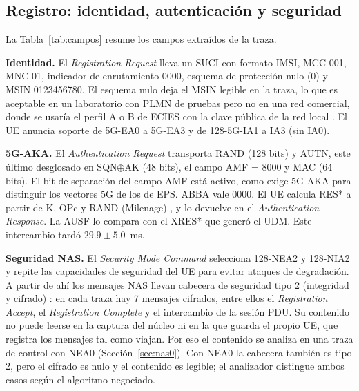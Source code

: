 \documentclass[conference]{IEEEtran}
\begin{document}
\subsection{Registro: identidad, autenticación y seguridad}
La Tabla~\ref{tab:campos} resume los campos extraídos de la traza.

\textbf{Identidad.} El \textit{Registration Request} lleva un SUCI con formato IMSI, MCC 001, MNC 01, indicador de enrutamiento 0000, esquema de protección nulo (0) y MSIN 0123456780. El esquema nulo deja el MSIN legible en la traza, lo que es aceptable en un laboratorio con PLMN de pruebas pero no en una red comercial, donde se usaría el perfil A o B de ECIES con la clave pública de la red local \cite{ts33501}. El UE anuncia soporte de 5G-EA0 a 5G-EA3 y de 128-5G-IA1 a IA3 (sin IA0).

\textbf{5G-AKA.} El \textit{Authentication Request} transporta RAND (128 bits) y AUTN, este último desglosado en SQN$\oplus$AK (48 bits), el campo AMF = 8000 y MAC (64 bits). El bit de separación del campo AMF está activo, como exige 5G-AKA para distinguir los vectores 5G de los de EPS. ABBA vale 0000. El UE calcula RES* a partir de K, OPc y RAND (Milenage) \cite{milenage}, y lo devuelve en el \textit{Authentication Response}. La AUSF lo compara con el XRES* que generó el UDM. Este intercambio tardó $29.9\pm5.0$~ms.

\textbf{Seguridad NAS.} El \textit{Security Mode Command} selecciona 128-NEA2 y 128-NIA2 y repite las capacidades de seguridad del UE para evitar ataques de degradación. A partir de ahí los mensajes NAS llevan cabecera de seguridad tipo 2 (integridad y cifrado) \cite{ts24501}: en cada traza hay 7 mensajes cifrados, entre ellos el \textit{Registration Accept}, el \textit{Registration Complete} y el intercambio de la sesión PDU. Su contenido no puede leerse en la captura del núcleo ni en la que guarda el propio UE, que registra los mensajes tal como viajan. Por eso el contenido se analiza en una traza de control con NEA0 (Sección~\ref{sec:nas0}). Con NEA0 la cabecera también es tipo 2, pero el cifrado es nulo y el contenido es legible; el analizador distingue ambos casos según el algoritmo negociado.
\end{document}
